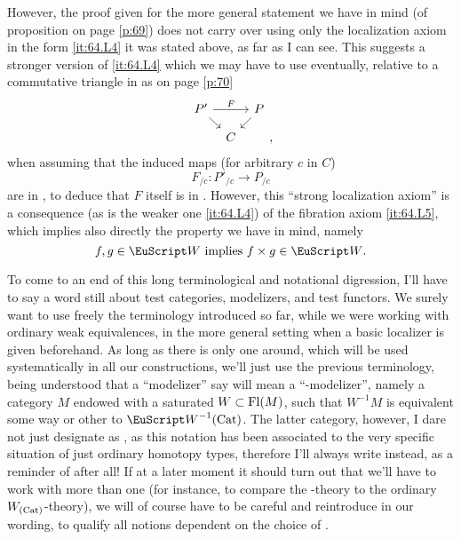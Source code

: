 However, the proof given for the more general statement we have in
mind (of proposition on page \ref{p:69}) does not carry over using
only the localization axiom in the form \ref{it:64.L4} it was stated
above, as far as I can see. This suggests a stronger version
 of \ref{it:64.L4} which we may have
to use eventually, relative to a commutative triangle in \Cat{} as on
page \ref{p:70}
\[\begin{tikzcd}[baseline=(O.base),column sep=tiny,row sep=small]
  P' \ar[dr]\ar[rr,"F"] & & P\ar[dl] \\ & |[alias=O]| C &
\end{tikzcd},\]
when assuming that the induced maps (for arbitrary $c$ in $C$)
\[F_{/c}: P'_{/c}\to P_{/c}\]
are in \scrW, to deduce that $F$ itself is in \scrW. However, this
``strong localization axiom'' is a consequence (as is the weaker one
\ref{it:64.L4}) of the fibration axiom \ref{it:64.L5}, which implies
also directly the property we have in mind, namely
\[\text{$f,g\in\scrW$ implies $f\times g\in\scrW$.}\]

To come to an end of this long terminological and
notational digression, I'll have to say a word still about test
categories, modelizers, and test functors. We surely want to use
freely the terminology introduced so far, while we were working with
ordinary weak equivalences, in the more general setting when a basic
localizer \scrW{} is given beforehand. As long as there is only one
\scrW{} around, which will be used systematically in all our
constructions, we'll just use the previous terminology, being
understood that a ``modelizer'' say will mean a ``\scrW-modelizer'',
namely a category $M$ endowed with a saturated $W\subset\operatorname{Fl}(M)$, such
that $W^{-1}M$ is equivalent some way or other to
$\scrW^{-1}\Cat$. The latter category, however, I dare not just
designate as \Hot, as this notation has been associated to the very
specific situation of just ordinary homotopy types, therefore I'll
always write \HotW{} instead, as a reminder of \scrW{} after all! If
at a later moment it should turn out that we'll have to work with more
than one \scrW{} (for instance, to compare the \scrW-theory to the
ordinary $W_{(\mathrm{Cat})}$-theory), we will of course have to be careful and
reintroduce \scrW{} in our wording, to qualify all notions dependent
on the choice of \scrW.

\bigbreak
\noindent\hfill{}\par

